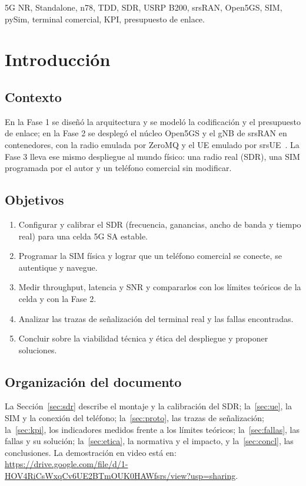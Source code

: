 \documentclass[conference]{IEEEtran}
\newcommand{\enlacevideo}{\url{https://drive.google.com/file/d/1-HOV4RiCsWxqCv6UE2BTmOUK0HAWfsrs/view?usp=sharing}}
\begin{document}
\begin{IEEEkeywords}
5G NR, Standalone, n78, TDD, SDR, USRP B200, srsRAN, Open5GS, SIM, pySim, terminal comercial, KPI, presupuesto de enlace.
\end{IEEEkeywords}

\section{Introducción}
\label{sec:intro}

\subsection{Contexto}
En la Fase 1 se diseñó la arquitectura y se modeló la codificación y el presupuesto de enlace; en la Fase 2 se desplegó el núcleo Open5GS y el gNB de srsRAN en contenedores, con la radio emulada por ZeroMQ y el UE emulado por srsUE~\cite{srsran,open5gs,ts23501}. La Fase 3 lleva ese mismo despliegue al mundo físico: una radio real (SDR), una SIM programada por el autor y un teléfono comercial sin modificar.

\subsection{Objetivos}
\begin{enumerate}
  \item Configurar y calibrar el SDR (frecuencia, ganancias, ancho de banda y tiempo real) para una celda 5G SA estable.
  \item Programar la SIM física y lograr que un teléfono comercial se conecte, se autentique y navegue.
  \item Medir throughput, latencia y SNR y compararlos con los límites teóricos de la celda y con la Fase 2.
  \item Analizar las trazas de señalización del terminal real y las fallas encontradas.
  \item Concluir sobre la viabilidad técnica y ética del despliegue y proponer soluciones.
\end{enumerate}

\subsection{Organización del documento}
La Sección~\ref{sec:sdr} describe el montaje y la calibración del SDR; la~\ref{sec:ue}, la SIM y la conexión del teléfono; la~\ref{sec:proto}, las trazas de señalización; la~\ref{sec:kpi}, los indicadores medidos frente a los límites teóricos; la~\ref{sec:fallas}, las fallas y su solución; la~\ref{sec:etica}, la normativa y el impacto, y la~\ref{sec:concl}, las conclusiones. La demostración en video está en: \enlacevideo.
\end{document}
